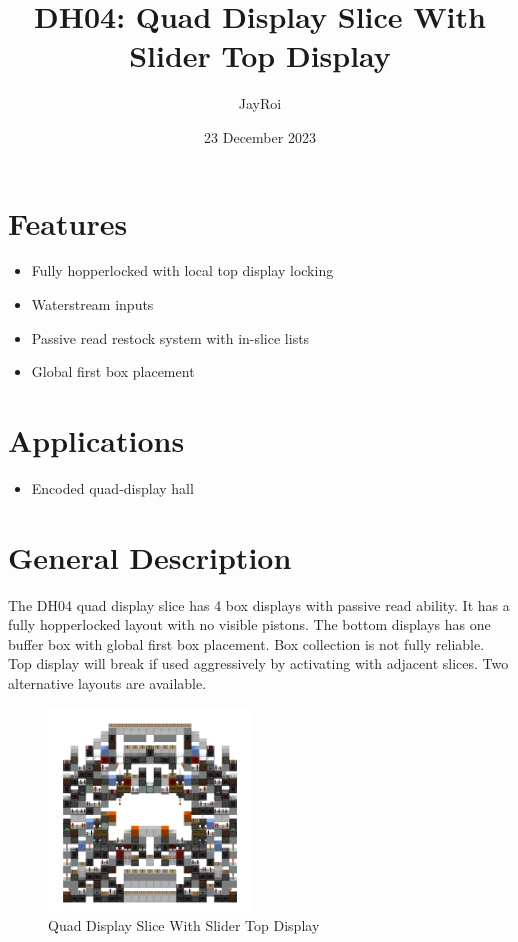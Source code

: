 \documentclass[10pt]{datasheet}
\title{DH04: Quad Display Slice With Slider Top Display}
\author{JayRoi}
\date{23 December 2023}
\begin{document}
\maketitle

\section{Features}

\begin{itemize}
\item{Fully hopperlocked with local top display locking}
\item{Waterstream inputs}
\item{Passive read restock system with in-slice lists}
\item{Global first box placement}
\end{itemize}

\section{Applications}

\begin{itemize}
\item{Encoded quad-display hall}
\end{itemize}

\section{General Description}
The DH04 quad display slice has 4 box displays with passive read ability. It has a fully hopperlocked layout with no visible pistons. The bottom displays has one buffer box with global first box placement. Box collection is not fully reliable. Top display will break if used aggressively by activating with adjacent slices. Two alternative layouts are available.

\vfill\break

\begin{figure}[h]
    \centering
    \includegraphics[width=0.48\textwidth]{slice2.png}
    \caption{\centering Quad Display Slice With Slider Top Display}
\end{figure}
\end{document}
